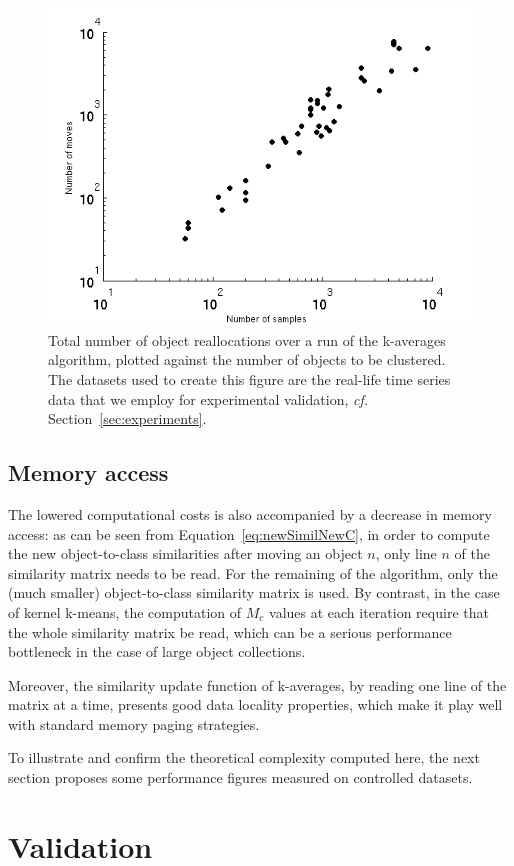\documentclass[natbib,smallextended]{svjour3}
\begin{document}
\begin{figure}
\center
\includegraphics[width = .65\textwidth]{figures/sampleMove.png}
\caption{Total number of object reallocations over a run of the k-averages algorithm, plotted against the number of objects to be clustered. The datasets used to create this figure are the real-life time series data that we employ for experimental validation, \textit{cf.} Section~\ref{sec:experiments}.}
\label{fig:totalMoved}
\end{figure}

\subsection{Memory access}

The lowered computational costs is also accompanied by a decrease in memory access: as can be seen from Equation~\ref{eq:newSimilNewC}, in order to compute the new object-to-class similarities after moving an object $n$, only line $n$ of the similarity matrix needs to be read. For the remaining of the algorithm, only the (much smaller) object-to-class similarity matrix is used. By contrast, in the case of kernel k-means, the computation of $M_c$ values at each iteration require that the whole similarity matrix be read, which can be a serious performance bottleneck in the case of large object collections.

Moreover, the similarity update function of k-averages, by reading one line of the matrix at a time, presents good data locality properties, which make it play well with standard memory paging strategies.

To illustrate and confirm the theoretical complexity computed here, the next section proposes some performance figures measured on controlled datasets.

\section{Validation}
\label{sec:validation}
\end{document}
